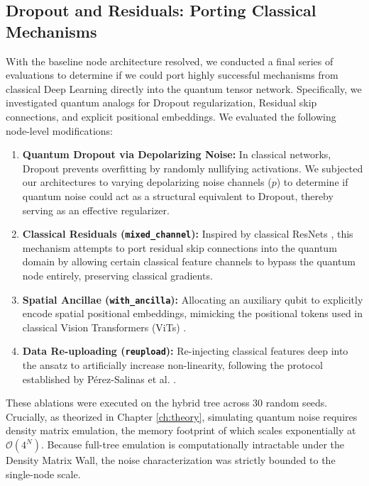 \documentclass[12pt, a4paper, oneside]{report}
\begin{document}
\subsection{Dropout and Residuals: Porting Classical Mechanisms}
\label{sec:ablations}

With the baseline node architecture resolved, we conducted a final series of evaluations to determine if we could port highly successful mechanisms from classical Deep Learning directly into the quantum tensor network. Specifically, we investigated quantum analogs for Dropout regularization, Residual skip connections, and explicit positional embeddings.
We evaluated the following node-level modifications:
\begin{enumerate}
    \item \textbf{Quantum Dropout via Depolarizing Noise:} In classical networks, Dropout \cite{srivastava2014dropout} prevents overfitting by randomly nullifying activations. We subjected our architectures to varying depolarizing noise channels ($p$) to determine if quantum noise could act as a structural equivalent to Dropout, thereby serving as an effective regularizer.
    \item \textbf{Classical Residuals (\texttt{mixed\_channel}):} Inspired by classical ResNets \cite{he2016resnet}, this mechanism attempts to port residual skip connections into the quantum domain by allowing certain classical feature channels to bypass the quantum node entirely, preserving classical gradients.
    \item \textbf{Spatial Ancillae (\texttt{with\_ancilla}):} Allocating an auxiliary qubit to explicitly encode spatial positional embeddings, mimicking the positional tokens used in classical Vision Transformers (ViTs) \cite{dosovitskiy2020vit}.
    \item \textbf{Data Re-uploading (\texttt{reupload}):} Re-injecting classical features deep into the ansatz to artificially increase non-linearity, following the protocol established by Pérez-Salinas et al. \cite{perez_salinas_2020}.
\end{enumerate}
These ablations were executed on the hybrid tree across 30 random seeds. Crucially, as theorized in Chapter \ref{ch:theory}, simulating quantum noise requires density matrix emulation, the memory footprint of which scales exponentially at $\mathcal{O}(4^N)$. Because full-tree emulation is computationally intractable under the Density Matrix Wall, the noise characterization was strictly bounded to the single-node scale.
\end{document}
